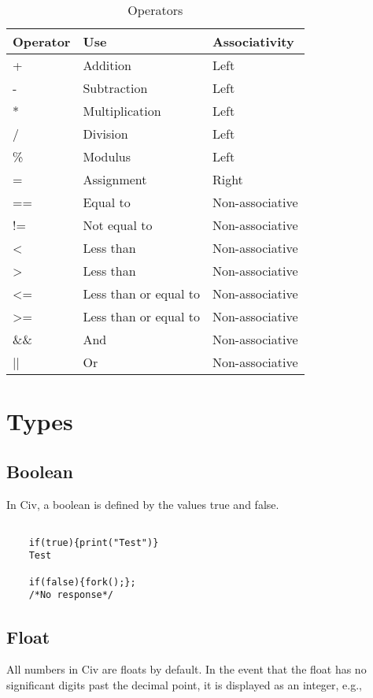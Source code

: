 \documentclass[a4paper]{article}
\begin{document}
\begin{table}
\centering
\begin{tabular}{|l|l|l|}
\hline
Operator & Use & Associativity\\
\hline
+ & Addition & Left\\
\hline
- & Subtraction & Left \\
\hline
* & Multiplication & Left\\
\hline
/ & Division & Left \\
\hline
\% & Modulus & Left \\
\hline
= & Assignment & Right \\
\hline 
== & Equal to & Non-associative\\
\hline
!= & Not equal to & Non-associative\\
\hline 
\textless & Less than & Non-associative\\
\hline 
\textgreater & Less than & Non-associative\\
\hline 
\textless= & Less than or equal to & Non-associative\\
\hline 
\textgreater= & Less than or equal to & Non-associative\\
\hline
\&\& & And & Non-associative\\
\hline
|| & Or & Non-associative\\
\hline
\end{tabular}
\caption{Operators}
\end{table}

\section{Types}

\subsection{Boolean}
In Civ, a boolean is defined by the values {\selectfont true} and {\selectfont false}. 

\begin{lstlisting} 
    
    if(true){print("Test")}
    Test
        
    if(false){fork();};
    /*No response*/

\end{lstlisting}


\subsection{Float}
All numbers in Civ are floats by default. In the event that the float has no significant digits past the decimal point, it is displayed as an integer, e.g.,
\end{document}
